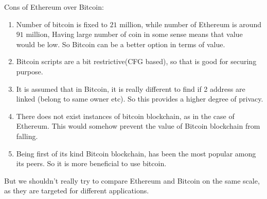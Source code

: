 \documentclass[a4paper]{article}
\begin{document}
Cons of Ethereum over Bitcoin:
\begin{enumerate}
    \item Number of bitcoin is fixed to $21$ million, while number of Ethereum is around $91$ million,
          Having large number of coin in some sense means that value would be low. So Bitcoin can be a better option
          in terms of value.
    \item Bitcoin scripts are a bit restrictive(CFG based), so that is good for securing purpose.
    \item It is assumed that in Bitcoin, it is really different to find if 2 address are linked (belong to same owner etc).
          So this provides a higher degree of privacy. 
    \item There does not exist instances of bitcoin blockchain, as in the case of Ethereum. This would somehow
          prevent the value of Bitcoin blockchain from falling.
    \item Being first of its kind Bitcoin blockchain, has been the most popular among its peers. So it is more
          beneficial to use bitcoin.
\end{enumerate}

But we shouldn't really try to compare Ethereum and Bitcoin on the same scale,
as they are targeted for different applications.
\end{document}
